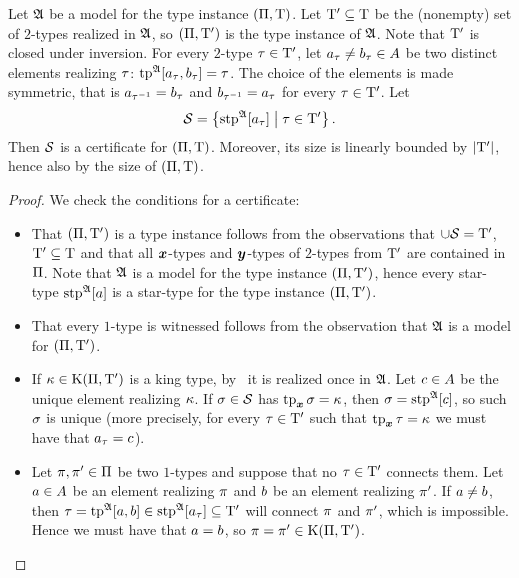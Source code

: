 \begin{lemma}\label{lem:cert-extract}
Let $\mathfrak{A}$ be a model for the type instance $(\Pi,\mathrm{T})$.
Let ${\mathrm{T}'} \subseteq \mathrm{T}$ be the (nonempty) set of $2$-types realized in
$\mathfrak{A}$, so $(\Pi,{\mathrm{T}'})$ is the type instance of $\mathfrak{A}$.
Note that ${\mathrm{T}'}$ is closed under inversion.
For every $2$-type $\tau \in {\mathrm{T}'}$,
let $a_{\tau} \neq b_{\tau} \in A$ be two distinct elements realizing
$\tau$: $\operatorname{tp}^{\mathfrak{A}}[a_{\tau},b_{\tau}] = \tau$. The choice of the
elements is made symmetric, that is $a_{\tau^{-1}} = b_{\tau}$ and
$b_{\tau^{-1}} = a_{\tau}$ for every $\tau\in{\mathrm{T}'}$.
Let 
\[
  \mathcal{S} = \left\{\operatorname{stp}^{\mathfrak{A}}[a_{\tau}]\mathrel{}\middle|\mathrel{}\tau\in{\mathrm{T}'}\right\}.
\]
Then $\mathcal{S}$ is a certificate for $(\Pi,\mathrm{T})$. Moreover, its size is
linearly bounded by $\left|{\mathrm{T}'}\right|$, hence also by the size of $(\Pi,\mathrm{T})$.
\end{lemma}
\begin{proof}
We check the conditions for a certificate:
\begin{itemize}
  \item[\refcertcond1] That $(\Pi,{\mathrm{T}'})$ is a type instance follows from
  the observations that $\cup\mathcal{S} = {\mathrm{T}'}$, ${\mathrm{T}'} \subseteq \mathrm{T}$ and that all $\bm{x}$-types
  and $\bm{y}$-types of $2$-types from ${\mathrm{T}'}$ are contained in $\Pi$. Note that
  $\mathfrak{A}$ is a model for the type instance $(\Pi,{\mathrm{T}'})$, hence every
  star-type $\operatorname{stp}^{\mathfrak{A}}[a]$ is a star-type for the type instance
  $(\Pi,{\mathrm{T}'})$.
  \item[\refcertcond2] That every $1$-type is witnessed follows from the
  observation that $\mathfrak{A}$ is a model for $(\Pi,{\mathrm{T}'})$.
  \item[\refcertcond3] If $\kappa \in \mathrm{K}(\Pi,{\mathrm{T}'})$ is a king type,
  by~ it is realized once in $\mathfrak{A}$.
  Let $c \in A$ be the unique element realizing $\kappa$.
  If $\sigma \in \mathcal{S}$ has $\operatorname{tp}_{\bm{x}}\sigma = \kappa$, then $\sigma = \operatorname{stp}^{\mathfrak{A}}[c]$,
  so such $\sigma$ is unique (more precisely, for every $\tau\in{\mathrm{T}'}$ such
  that $\operatorname{tp}_{\bm{x}}\tau = \kappa$ we must have that $a_{\tau} = c$).
  \item[\refcertcond4] Let $\pi, {\pi'} \in \Pi$ be two $1$-types and
  suppose that no $\tau\in{\mathrm{T}'}$ connects them. Let $a\in A$ be an element realizing
  $\pi$ and $b$ be an element realizing ${\pi'}$. If $a \neq b$, then
  $\tau = \operatorname{tp}^{\mathfrak{A}}[a,b] \in \operatorname{stp}^{\mathfrak{A}}[a_\tau] \subseteq {\mathrm{T}'}$ will
  connect $\pi$ and ${\pi'}$, which is impossible. Hence we must have that
  $a = b$, so $\pi = {\pi'} \in \mathrm{K}(\Pi,{\mathrm{T}'})$.
\end{itemize}
\end{proof}


